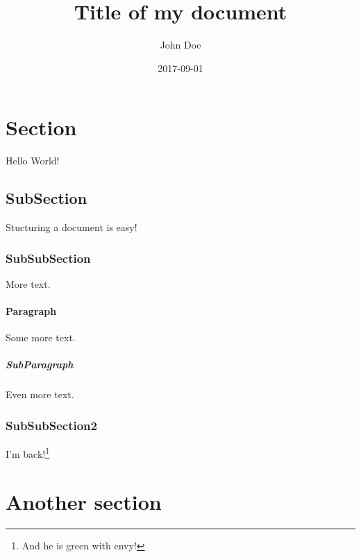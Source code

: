 \documentclass{article}
\title{Title of my document}
\date{2017-09-01}
\author{John Doe}
\begin{document}
\maketitle
\newpage
\tableofcontents
\newpage

%
\section{Section}
Hello World!
\subsection{SubSection}
Stucturing a document is easy!
\subsubsection{SubSubSection}
More text.
\paragraph{Paragraph}
Some more text.
\subparagraph{SubParagraph}
Even more text.
\subsubsection{SubSubSection2}
I'm back!\footnote{\label{myfootnote}And he is green with envy!}
\section{Another section}
\end{document}
